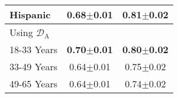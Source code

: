 \begin{table}[t]
\begin{center}
\begin{small}
\begin{sc}
\begin{tabular}{l|cc}
    Hispanic    & 0.68$\pm$0.01 & 0.81$\pm$0.02 \\
    \midrule
    Using $\mathcal{D}_\text{A}$ & &\\
    18-33 Years    & \textbf{0.70$\pm$0.01} & \textbf{0.80$\pm$0.02} \\
    33-49 Years    & 0.64$\pm$0.01 & 0.75$\pm$0.02 \\
    49-65 Years    & 0.64$\pm$0.01 & 0.74$\pm$0.02 \\
    \bottomrule
    \end{tabular}
    \end{sc}
    \end{small}
    \end{center}
    \vskip -0.1in
\end{table}

